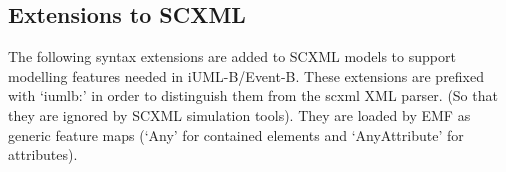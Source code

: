 \subsection{Extensions to SCXML}
\label{sect:extension-to-SCXML}

The following syntax extensions are added to SCXML models 
to support modelling features needed in iUML-B/Event-B. 
These extensions are prefixed with ‘iumlb:’ in order to 
distinguish them from the scxml XML parser. (So that they 
are ignored by SCXML simulation tools). They are loaded by 
EMF as generic feature maps (‘Any’ for contained elements 
and ‘AnyAttribute’ for attributes).

\begin{table}[tbp]
\centering
{}
\caption{New Elements}
\label{iumlb_elements_table}
\end{table}

